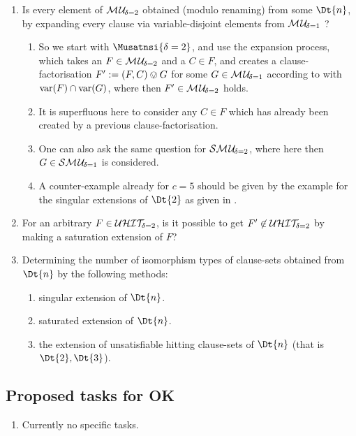 \documentclass{article}
\begin{document}
\begin{enumerate}
\item Is every element of $\mathcal{M\hspace{0.8pt}U}_{\!\delta=2}$ obtained (modulo renaming) from some $\Dt{n}$, by expanding every clause via variable-disjoint elements from $\mathcal{M\hspace{0.8pt}U}_{\!\delta=1}$ ?
  \begin{enumerate}
  \item So we start with $\Musatnsi{\delta=2}$, and use the expansion process, which takes an $F \in \mathcal{M\hspace{0.8pt}U}_{\!\delta=2}$ and a $C \in F$, and creates a clause-factorisation $F' := (F,C) \mathbin{\ovee} G$ for some $G \in \mathcal{M\hspace{0.8pt}U}_{\!\delta=1}$ according to \cite[Definition 27]{KullmannZhao2016UHitSAT} with $\operatorname{var}(F) \cap \operatorname{var}(G)$, where then $F' \in \mathcal{M\hspace{0.8pt}U}_{\!\delta=2}$ holds.
  \item It is superfluous here to consider any $C \in F$ which has already been created by a previous clause-factorisation.
  \item One can also ask the same question for $\mathcal{S}\mathcal{M\hspace{0.8pt}U}_{\!\delta=2}$, where here then $G \in \mathcal{S}\mathcal{M\hspace{0.8pt}U}_{\!\delta=1}$ is considered.
  \item A counter-example already for $c=5$ should be given by the example for the singular extensions of $\Dt{2}$ as given in \cite{KullmannZhao2014UHit}.
  \end{enumerate}
  \item For an arbitrary $F \in \mathcal{U}\mathcal{HIT}_{\!\!\delta=2}$, is it possible to get $F' \not \in \mathcal{U}\mathcal{HIT}_{\!\!\delta=2}$ by making a saturation extension of $F$?
  \item Determining the number of isomorphism types of clause-sets obtained from $\Dt{n}$ by the following methods:
  \begin{enumerate}
  \item singular extension of $\Dt{n}$.
  \item saturated extension of $\Dt{n}$.
  \item the extension of unsatisfiable hitting clause-sets of $\Dt{n}$ (that is $\Dt{2}, \Dt{3}$).
  \end{enumerate}
\end{enumerate}


\subsection{Proposed tasks for OK}

\begin{enumerate}
\item Currently no specific tasks.
\end{enumerate}
\end{document}
